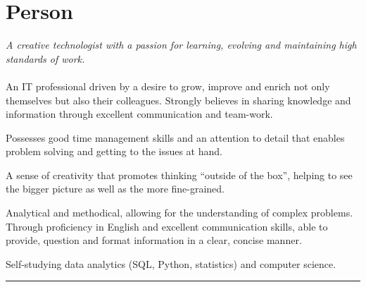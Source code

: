\documentclass[10pt,a4paper]{article}
\begin{document}
{
	\fancyhf{}
	\setlength\headheight{43pt}
	\fancyfoot[CO]{}
}

\thispagestyle{firstpage}
\vspace*{-2.5em}

\section{Person}
\begin{multicols}{2}
    \noindent \small\emph{\color{gray}\small A creative technologist with a passion for learning, evolving and maintaining high standards of work.}\\\\
    \noindent An IT professional driven by a desire to grow, improve and enrich not only themselves but also their colleagues. Strongly believes in sharing knowledge and information through excellent communication and team-work.

    \noindent Possesses good time management skills and an attention to detail that enables problem solving and getting to the issues at hand.
    
    \noindent A sense of creativity that promotes thinking ``outside of the box'', helping to see the bigger picture as well as the more fine-grained.

    \noindent Analytical and methodical, allowing for the understanding of complex problems. Through proficiency in English and excellent communication skills, able to provide, question and format information in a clear, concise manner.

    \noindent Self-studying data analytics (SQL, Python, statistics) and computer science.
\end{multicols}

\hrule
\vspace*{2em}
\end{document}
